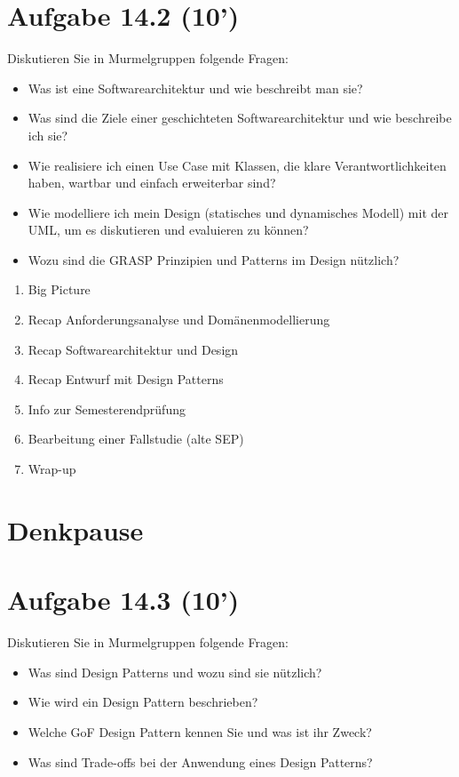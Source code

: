 \documentclass[10pt]{article}
\begin{document}
\section*{Aufgabe 14.2 (10')}
Diskutieren Sie in Murmelgruppen folgende Fragen:

\begin{itemize}
  \item Was ist eine Softwarearchitektur und wie beschreibt man sie?
  \item Was sind die Ziele einer geschichteten Softwarearchitektur und wie beschreibe ich sie?
  \item Wie realisiere ich einen Use Case mit Klassen, die klare Verantwortlichkeiten haben, wartbar und einfach erweiterbar sind?
  \item Wie modelliere ich mein Design (statisches und dynamisches Modell) mit der UML, um es diskutieren und evaluieren zu können?
  \item Wozu sind die GRASP Prinzipien und Patterns im Design nützlich?
\end{itemize}

\begin{enumerate}
  \item Big Picture
  \item Recap Anforderungsanalyse und Domänenmodellierung
  \item Recap Softwarearchitektur und Design
  \item Recap Entwurf mit Design Patterns
  \item Info zur Semesterendprüfung
  \item Bearbeitung einer Fallstudie (alte SEP)
  \item Wrap-up
\end{enumerate}

\section*{Denkpause}
\section*{Aufgabe 14.3 (10')}
Diskutieren Sie in Murmelgruppen folgende Fragen:

\begin{itemize}
  \item Was sind Design Patterns und wozu sind sie nützlich?
  \item Wie wird ein Design Pattern beschrieben?
  \item Welche GoF Design Pattern kennen Sie und was ist ihr Zweck?
  \item Was sind Trade-offs bei der Anwendung eines Design Patterns?
\end{itemize}
\end{document}
